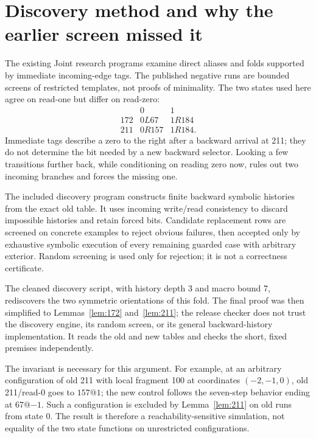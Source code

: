 \documentclass[11pt,letterpaper]{article}
\begin{document}
\section{Discovery method and why the earlier screen missed it}
\label{sec:discovery}

The existing Joint research programs examine direct aliases and folds
supported by immediate incoming-edge tags. The published negative runs
are bounded screens of restricted templates, not proofs of minimality.
The two states used here agree on read-one but differ on read-zero:
\[
\begin{array}{c|cc}
 &0&1\\\hline
172&0L67&1R184\\
211&0R157&1R184.
\end{array}
\]
Immediate tags describe a zero to the right after a backward arrival at
211; they do not determine the bit needed by a new backward selector.
Looking a few transitions further back, while conditioning on reading
zero now, rules out two incoming branches and forces the missing one.

The included discovery program constructs finite backward symbolic
histories from the exact old table. It uses incoming write/read consistency
to discard impossible histories and retain forced bits. Candidate
replacement rows are screened on concrete examples to reject obvious
failures, then accepted only by exhaustive symbolic execution of every
remaining guarded case with arbitrary exterior. Random screening is used
only for rejection; it is not a correctness certificate.

The cleaned discovery script, with history depth 3 and macro bound 7,
rediscovers the two symmetric orientations of this fold. The final proof
was then simplified to Lemmas~\ref{lem:172} and~\ref{lem:211}; the release
checker does not trust the discovery engine, its random screen, or its
general backward-history implementation. It reads the old and new tables
and checks the short, fixed premises independently.

The invariant is necessary for this argument. For example, at an arbitrary
configuration of old 211 with local fragment 100 at coordinates
\((-2,-1,0)\), old 211/read-0 goes to \(157@1\); the new control follows
the seven-step behavior ending at \(67@{-1}\). Such a configuration is
excluded by Lemma~\ref{lem:211} on old runs from state 0. The result is
therefore a reachability-sensitive simulation, not equality of the two
state functions on unrestricted configurations.
\end{document}
